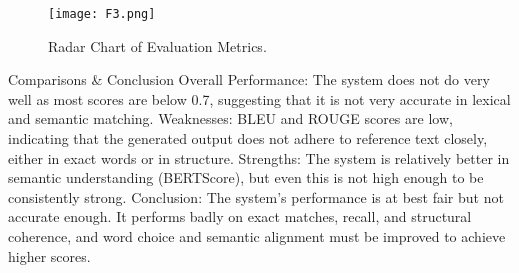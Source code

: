 \begin{figure}[h!]
    \centering
    \texttt{[image: F3.png]}
    \caption{Radar Chart of Evaluation Metrics.}
    \label{fig:f3}
\end{figure}
Comparisons \& Conclusion
Overall Performance: The system does not do very well as most scores are below 0.7, suggesting that it is not very accurate in lexical and semantic matching.
Weaknesses: BLEU and ROUGE scores are low, indicating that the generated output does not adhere to reference text closely, either in exact words or in structure.
Strengths: The system is relatively better in semantic understanding (BERTScore), but even this is not high enough to be consistently strong.
Conclusion: The system's performance is at best fair but not accurate enough. It performs badly on exact matches, recall, and structural coherence, and word choice and semantic alignment must be improved to achieve higher scores.